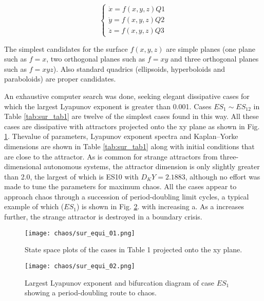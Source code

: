 \begin{equation}
\label{eq:sur_eq3}
  \left\{
  \begin{array}{l}
    \dot{x} = f(x, y, z) Q1\\
    \dot{y} = f(x, y, z) Q2\\
    \dot{z} = f(x, y, z) Q3
  \end{array}
  \right.
\end{equation}

The simplest candidates for the surface \(f(x, y, z)\) are
simple planes (one plane such as \(f = x\), two orthogonal
planes such as \(f = xy\) and three orthogonal
planes such as \(f = xyz\)). Also standard quadrics
(ellipsoids, hyperboloids and paraboloids) are proper
candidates.

An exhaustive computer search was done, seeking
elegant\cite{01_Sprott2010Elegant}  
dissipative cases for which the largest Lyapunov
exponent is greater than 0.001. Cases \(ES_1\sim{}ES_{12}\)
in Table \ref{tab:sur_tab1} are twelve of the simplest cases found in this
way. All these cases are dissipative with attractors projected
onto the xy plane as shown in Fig. \ref{fig:sur_fig1}. Thevalue of
parameters, Lyapunov exponent spectra and Kaplan–Yorke 
dimensions are shown in Table \ref{tab:sur_tab1} along with
initial conditions that are close to the attractor. As is
common for strange attractors from three-dimensional
autonomous systems, the attractor dimension is only
slightly greater than 2.0, the largest of which is ES10
with \(D_KY = 2.1883\), although no effort was made
to tune the parameters for maximum chaos. All the
cases appear to approach chaos through a succession
of period-doubling limit cycles, a typical example of
which (\(ES_1\)) is shown in Fig. \ref{fig:sur_fig2}. with increasing a. As
a increases further, the strange attractor is destroyed in
a boundary crisis.

\begin{figure}[htbp]
\centering
\texttt{[image: chaos/sur\_equi\_01.png]}
\caption{\label{fig:sur_fig1}
State space plots of the cases in Table 1 projected onto the xy plane.}
\end{figure}

\begin{figure}[htbp]
\centering
\texttt{[image: chaos/sur\_equi\_02.png]}
\caption{\label{fig:sur_fig2}
Largest Lyapunov exponent and bifurcation diagram of case $ES_1$
showing a period-doubling route to chaos.}
\end{figure}

